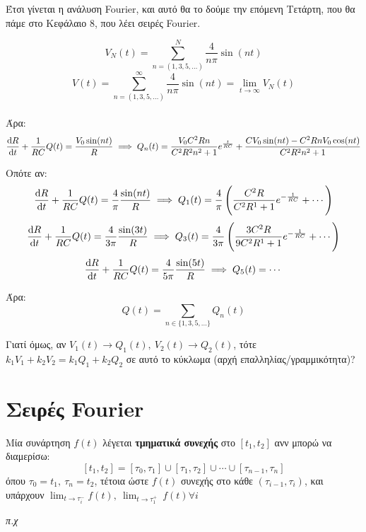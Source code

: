 \documentclass[11pt,a4paper,titlepage,final]{article}
\begin{document}
Έτσι γίνεται η ανάλυση \textlatin{Fourier}, και αυτό θα το δούμε την επόμενη Τετάρτη, που θα πάμε στο Κεφάλαιο 8, που λέει σειρές \textlatin{Fourier}.

\[
V_N(t) = \sum _{n = (1,3,5,\dots)}^N \frac{4}{n \pi} \sin (n t)
\]
\[
V(t) = \sum _{n = (1,3,5,\dots)}^\infty \frac{4}{n \pi} \sin (n t) = \lim_{t \to \infty} V_N(t)
\]

\paragraph{}
Άρα:
\[
 \frac{\dif R}{\dif t}  + \frac{1}{RC}Q(t) = \frac{V_0 \sin (nt)}{R} \implies
 Q_n(t) = \frac{V_0C^2Rn}{C^2R^2n^2+1}e^{\frac{t}{RC}} + \frac{CV_0\sin (nt) - C^2RnV_0 \cos (nt)}{C^2R^2n^2+1}
\]

Οπότε αν:
\[
 \frac{\dif R}{\dif t}  + \frac{1}{RC}Q(t) = \frac{4}{\pi} \frac{\sin (nt)}{R} \implies
 Q_1(t) = \frac{4}{\pi} \left( \frac{C^2R}{C^2R^1+1} e^{-\frac{1}{RC}}+ \cdots \right)
\]
\[
 \frac{\dif R}{\dif t}  + \frac{1}{RC}Q(t) = \frac{4}{3\pi} \frac{\sin (3t)}{R} \implies
 Q_3(t) = \frac{4}{3\pi} \left( \frac{3C^2R}{9C^2R^1+1} e^{-\frac{1}{RC}}+ \cdots \right)
\]
\[
 \frac{\dif R}{\dif t}  + \frac{1}{RC}Q(t) = \frac{4}{5\pi} \frac{\sin (5t)}{R} \implies
 Q_5(t) = \cdots
\]

Άρα:
\[
Q(t) = \sum_{n \in \lbrace1,3,5,\dots\rbrace}Q_n(t)
\]

Γιατί όμως, αν \(V_1(t) \rightarrow Q_1(t), \ V_2(t) \rightarrow Q_2(t)\), τότε \(k_1V_1+k_2V_2 = k_1Q_1 +k_2Q_2\) σε αυτό το κύκλωμα (αρχή επαλληλίας/γραμμικότητα)?


\section{Σειρές \textlatin{Fourier}}

\begin{defn*}{}
Μία συνάρτηση \(f(t)\) λέγεται \textbf{τμηματικά συνεχής} στο \([t_1,t_2]\) ανν μπορώ να διαμερίσω:
\[ [t_1,t_2] = [\tau_0,\tau_1] \cup [\tau_1,\tau_2] \cup \cdots \cup [\tau_{n-1},\tau_n] \]
όπου \(\tau_0 = t_1,\ \tau_n = t_2\), τέτοια ώστε \(f(t)\) συνεχής στο κάθε \((\tau_{i-1},\tau_i)\), και υπάρχουν \(\lim_{t \to \tau_i^-} f(t),\ \lim_{t \to \tau_1^+}\ f(t) \forall i\)
\end{defn*}

\textit{π.χ}
\end{document}

